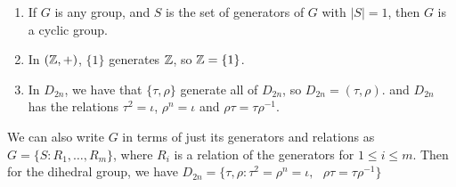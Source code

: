 \begin{example}
    \begin{enumerate}[label=(\arabic*)]
        \item If $G$ is any group, and  $S$ is the set of generators of  $G$ with  $|S|=1$, then
            $G$ is a cyclic group.

        \item In $(\mathbb{Z},+)$, $\{1\}$ generates $\mathbb{Z}$, so  $\mathbb{Z}=\{1\}$.

        \item In $D_{2n}$, we have that $\{\tau,\rho\}$ generate all of $D_{2n}$, so
            $D_{2n}=(\tau,\rho)$. and $D_{2n}$ has the relations $\tau^2=\iota$,  $\rho^n=\iota$ and
             $\rho\tau=\tau\rho^{-1}$.
    \end{enumerate}		
\end{example} 

We can also write $G$ in terms of just its generators and relations as  $G=\{S:R_1, \dots, R_m\}$,
where $R_i$ is a relation of the generators for  $1 \leq i \leq m$. Then for the dihedral group, we
have  $D_{2n}=\{\tau,\rho:\tau^2=\rho^n=\iota, \text{ } \rho\tau=\tau\rho^{-1}\}$
